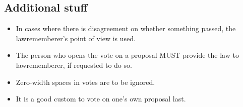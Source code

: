 \documentclass[11pt]{article}
\begin{document}
\subsection{Additional stuff}

\begin{itemize}
\item In cases where there is disagreement on whether something passed, the lawrememberer's point of view is used.
\item The person who opens the vote on a proposal MUST provide the law to lawrememberer, if requested to do so.
\item Zero-width spaces in votes are to be ignored.
\item It is a good custom to vote on one's own proposal last.
\end{itemize}
\end{document}
